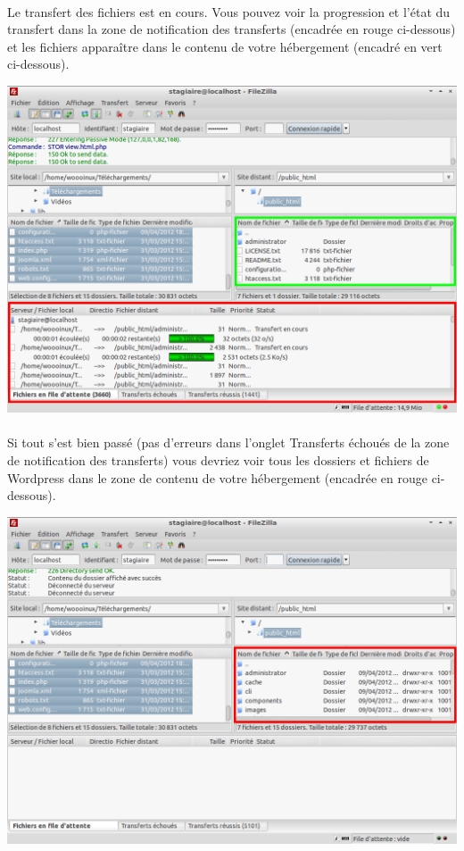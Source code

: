 \documentclass[10pt,a4paper]{article}
\begin{document}
\paragraph{}Le transfert des fichiers est en cours. Vous pouvez voir la progression et l'état du transfert dans la zone de notification des transferts (encadrée en rouge ci-dessous) et les fichiers apparaître dans le contenu de votre hébergement (encadré en vert ci-dessous).
\begin{center}
\includegraphics[scale=0.35]{img/0037.png}
\end{center}
\paragraph{}Si tout s'est bien passé (pas d'erreurs dans l'onglet Transferts échoués de la zone de notification des transferts) vous devriez voir tous les dossiers et fichiers de Wordpress dans le zone de contenu de votre hébergement (encadrée en rouge ci-dessous).
\begin{center}
\includegraphics[scale=0.35]{img/0038.png}
\end{center}
\end{document}
